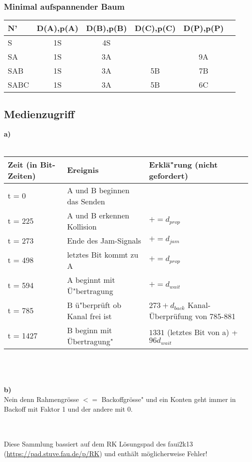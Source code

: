 \documentclass{article}
\begin{document}
			\subsubsection{Minimal aufspannender Baum}
				\begin{tabular}{| l | c | c | c | c | c |}
																								\hline
					N'		&	D(A),p(A)	&	D(B),p(B)	&	D(C),p(C)	&	D(P),p(P) 	\\ \hline
					S		&	1S	&		4S		&				&				  		\\ \hline
					SA		&	1S	&		3A		&				&	9A					\\ \hline
					SAB		&	1S	&		3A		&	5B			&	7B					\\ \hline
					SABC	&	1S	&		3A		&	5B			&	6C					\\ \hline
				\end{tabular}
			\subsection{Medienzugriff}
				\textbf{a)}\\ \\
					\begin{tabular}{|l|l|l|}
						\hline
						Zeit (in Bit-Zeiten)	&	Ereignis			& Erkl\"a"rung (nicht gefordert)	\\ \hline
						t = 0		&	A und B beginnen das Senden		&									\\ \hline
						t = 225 	&	A und B erkennen Kollision		&	$+=d_{prop}$					\\ \hline
						t = 273		&	Ende des Jam-Signals			&	$+=d_{jam}$						\\ \hline
						t = 498		&	letztes Bit kommt zu A			&	$+=d_{prop}$					\\ \hline
						t = 594		&	A beginnt mit \"U"bertragung	&	$+=d_{wait}$					\\ \hline
						t = 785		&	B \"u"berprüft ob Kanal frei ist&	$273+d_{back}$ Kanal-\"Uberpr\"ufung von 785-881	\\ \hline
						t = 1427	&	B beginn mit \"Ubertragung"		&	$1331$ (letztes Bit von a) + $96 d_{wait}$			\\ \hline
					\end{tabular}\\ \\ \\
				\textbf{b)}\\
					Nein denn Rahmengr\"osse $<=$ Backoffgr\"osse" und ein Konten geht immer in Backoff mit Faktor 1 und der andere mit 0.
					\\\\\\
					
	\begin{small}
		Diese Sammlung bassiert auf dem RK L\"osungspad des faui2k13 (\url{https://pad.stuve.fau.de/p/RK}) und enthält möglicherweise Fehler!
	\end{small}			
\end{document}
